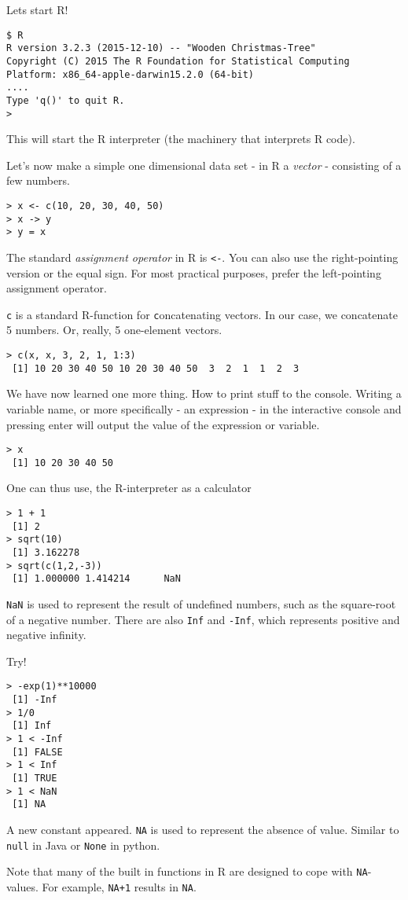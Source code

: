 \documentclass{article}[11pt]
\begin{document}
Lets start R!

\begin{verbatim}
$ R
R version 3.2.3 (2015-12-10) -- "Wooden Christmas-Tree"
Copyright (C) 2015 The R Foundation for Statistical Computing
Platform: x86_64-apple-darwin15.2.0 (64-bit)
....
Type 'q()' to quit R.
> 
\end{verbatim}

This will start the R interpreter (the machinery that interprets R code).

Let's now make a simple one dimensional data set - in R a
\emph{vector} - consisting of a few numbers.

\begin{verbatim}
> x <- c(10, 20, 30, 40, 50)
> x -> y
> y = x
\end{verbatim}

The standard \emph{assignment operator} in R is \texttt{<-}. You can
also use the right-pointing version or the equal sign. For most
practical purposes, prefer the left-pointing assignment operator.

\texttt{c} is a standard R-function for \texttt{c}oncatenating vectors. In our case, we concatenate 5 numbers. Or, really, 5 one-element vectors.

\begin{verbatim}
> c(x, x, 3, 2, 1, 1:3)
 [1] 10 20 30 40 50 10 20 30 40 50  3  2  1  1  2  3
\end{verbatim}

We have now learned one more thing. How to print stuff to the
console. Writing a variable name, or more specifically - an expression
- in the interactive console and pressing enter will output the value
of the expression or variable.

\begin{verbatim}
> x
 [1] 10 20 30 40 50
\end{verbatim}

One can thus use, the R-interpreter as a calculator

\begin{verbatim}
> 1 + 1
 [1] 2
> sqrt(10)
 [1] 3.162278
> sqrt(c(1,2,-3))
 [1] 1.000000 1.414214      NaN
\end{verbatim}


\texttt{NaN} is used to represent the result of undefined numbers,
such as the square-root of a negative number. There are also
\texttt{Inf} and \texttt{-Inf}, which represents positive and negative infinity.

Try!


\begin{verbatim}
> -exp(1)**10000
 [1] -Inf
> 1/0
 [1] Inf
> 1 < -Inf
 [1] FALSE
> 1 < Inf
 [1] TRUE
> 1 < NaN
 [1] NA
\end{verbatim}

A new constant appeared. \texttt{NA} is used to represent the absence
of value. Similar to \texttt{null} in Java or \texttt{None} in python.

Note that many of the built in functions in R are designed to cope
with \texttt{NA}-values. For example, \texttt{NA+1} results in
\texttt{NA}.
\end{document}
